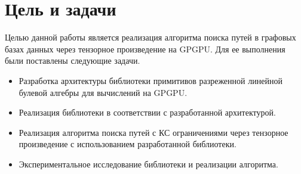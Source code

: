 \section{Цель и задачи}

Целью данной работы является реализация алгоритма поиска путей в графовых базах данных через тензорное произведение на GPGPU. Для ее выполнения были поставлены следующие задачи.

\begin{itemize}
    \item Разработка архитектуры библиотеки примитивов разреженной линейной булевой алгебры для вычислений на GPGPU.
    \item Реализация библиотеки в соответствии с разработанной архитектурой.
    \item Реализация алгоритма поиска путей с КС ограничениями через тензорное произведение с использованием разработанной библиотеки.
    \item Экспериментальное исследование библиотеки и реализации алгоритма.
\end{itemize}